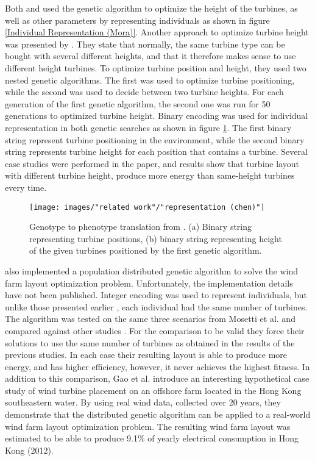 \noindent Both \cite{Mora} and \cite{Gonzalez} used the genetic algorithm to optimize the height of the turbines, as well as other parameters by representing individuals as shown in figure \ref{Individual Representation (Mora)}. Another approach to optimize turbine height was presented by \cite{Chen}. They state that normally, the same turbine type can be bought with several different heights, and that it therefore makes sense to use different height turbines. To optimize turbine position and height, they used two nested genetic algorithms. The first was used to optimize turbine positioning, while the second was used to decide between two turbine heights. For each generation of the first genetic algorithm, the second one was run for 50 generations to optimized turbine height. Binary encoding was used for individual representation in both genetic searches as shown in figure \ref{Representation (Chen)}. The first binary string represent turbine positioning in the environment, while the second binary string represents turbine height for each position that contains a turbine. Several case studies were performed in the paper, and results show that turbine layout with different turbine height, produce more energy than same-height turbines every time. \\


\begin{figure}[h!]
\begin{center}
\texttt{[image: images/"related work"/"representation (chen)"]}
\caption{Genotype to phenotype translation from \cite{Chen}. (a) Binary string representing turbine positions, (b) binary string representing height of the given turbines positioned by the first genetic algorithm.}
\label{Representation (Chen)}
\end{center}
\end{figure}


\noindent \cite{Gao} also implemented a population distributed genetic algorithm to solve the wind farm layout optimization problem. Unfortunately, the implementation details have not been published. Integer encoding was used to represent individuals, but unlike those presented earlier \citep{Mora, Kusiak, Gonzalez, Saavedra-Morena}, each individual had the same number of turbines. The algorithm was tested on the same three scenarios from Mosetti et al. and compared against other studies \citep{Mosetti, Grady, Gonzalez, Wan}. For the comparison to be valid they force their solutions to use the same number of turbines as obtained in the results of the previous studies. In each case their resulting layout is able to produce more energy, and has higher efficiency, however, it never achieves the highest fitness. In addition to this comparison, Gao et al. introduce an interesting hypothetical case study of wind turbine placement on an offshore farm located in the Hong Kong southeastern water. By using real wind data, collected over 20 years, they demonstrate that the distributed genetic algorithm can be applied to a real-world wind farm layout optimization problem. The resulting wind farm layout was estimated to be able to produce 9.1\% of yearly electrical consumption in Hong Kong (2012).


